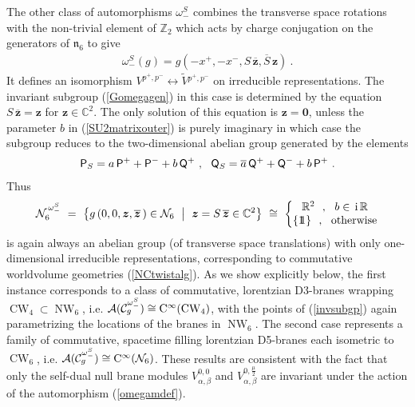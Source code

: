 \documentclass[11pt,a4paper]{article}
\DeclareMathOperator{\NW}{NW}
\DeclareMathOperator{\CW}{CW}
\newcommand{\ii}{{\rm i}}
\newcommand{\mbf}[1]{{\boldsymbol {#1} }}
\def\ii{{\,{\rm i}\,}}
\def\P{{\sf P}}
\def\Q{{\sf Q}}
\def\mz{{\mbf z}}
\newcommand{\complex}{{\mathbb C}} %
\newcommand{\zed}{{\mathbb Z}} %
\newcommand{\real}{{\mathbb R}} %
\newcommand{\id}{{1\!\!1}} %
\newcommand{\beq}{\begin{eqnarray}}
\newcommand{\eeq}{\end{eqnarray}}
\begin{document}
The other class of automorphisms $\omega_-^S$ combines the transverse space
rotations with the non-trivial element of $\zed_2$ which acts by charge
conjugation on the generators of $\mathfrak{n}_6$ to give
\beq
\omega_-^S(g)=g\left(-x^+,-x^-,S\,\overline{\mz},\overline{S}\,\mz
\right) \ .
\label{omegamdef}\eeq
It defines an isomorphism
$V^{p^+,p^-}\leftrightarrow\widetilde{V}{}^{p^+,p^-}$ on irreducible
representations. The invariant subgroup (\ref{Gomegagen}) in this case
is determined by the equation $S\,\overline{\mz}=\mz$ for
$\mz\in\complex^2$. The only solution of this equation is $\mz=\mbf0$,
unless the parameter $b$ in (\ref{SU2matrixouter}) is purely imaginary
in which case the subgroup reduces to the two-dimensional abelian
group generated by the elements
\beq
\P_S=a\,\P^++\P^-+b\,\Q^+ \ , ~~ \Q_S=
\overline{a}\,\Q^++\Q^-+b\,\P^+ \ .
\label{2Dabgp}\eeq
Thus
\beq
\mathcal{N}_6^{\,\omega_-^S}~=~\bigl\{g\left(0,0,\mz,\overline{\mz}\,\right)
\in\mathcal{N}_6~
\bigm|~\mz=S\,\overline{\mz}\in\complex^2\bigr\}~\cong~\left\{\begin{matrix}
\real^2~~,~~b\in\ii\real\\\{\id\}~~,~~{\rm otherwise}\end{matrix}
\right.
\label{invsubgp}\eeq
is again always an abelian group (of transverse space translations) with only
one-dimensional irreducible representations, corresponding to commutative
worldvolume geometries (\ref{NCtwistalg}). As we show explicitly below, the
first instance corresponds to a class of commutative, lorentzian D3-branes
wrapping $\CW_4\subset\NW_6$, i.e.
$\mathcal{A}(\mathcal{C}_g^{\omega_-^S})\cong{\rm C}^\infty(\CW_4)$,
with the points of (\ref{invsubgp}) again parametrizing the locations
of the branes in $\NW_6$. The second case represents a family of
commutative, spacetime filling lorentzian D5-branes each isometric to
$\CW_6$, i.e. $\mathcal{A}(\mathcal{C}_g^{\omega_-^S})\cong{\rm
  C}^\infty(\mathcal{N}_6)$. These results are consistent with the
fact that only the self-dual null brane modules
$V_{\alpha,\beta}^{0,0}$ and $V_{\alpha,\beta}^{0,\frac\mu2}$ are
invariant under the action of the automorphism (\ref{omegamdef}).
\end{document}
